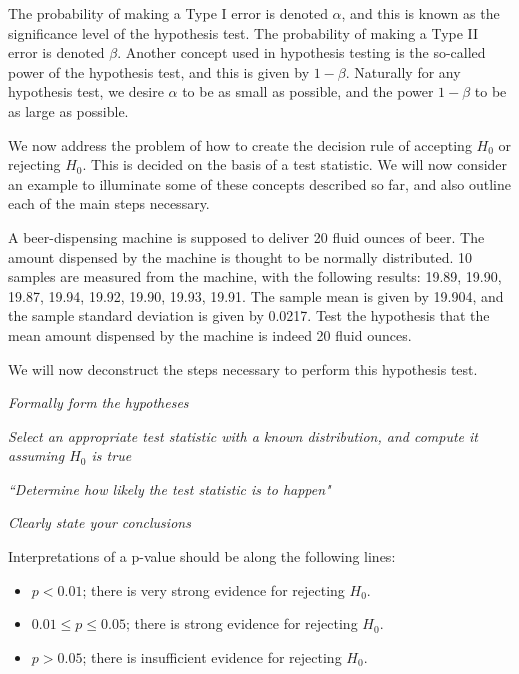 \documentclass[12pt]{article}
\newenvironment{example}[1][Example:]{\begin{trivlist}
\item[\hskip \labelsep {\bfseries #1}]}{\end{trivlist}}
\begin{document}
The probability of making a Type I error is denoted $\alpha$, and this is known as the significance level of the hypothesis test. The probability of making a Type II error is denoted $\beta$. Another concept used in hypothesis testing is the so-called power of the hypothesis test, and this is given by $1-\beta$. Naturally for any hypothesis test, we desire $\alpha$ to be as small as possible, and the power $1-\beta$ to be as large as possible.

We now address the problem of how to create the decision rule of accepting $H_0$ or rejecting $H_0$. This is decided on the basis of a test statistic. We will now consider an example to illuminate some of these concepts described so far, and also outline each of the main steps necessary.

\begin{example}
A beer-dispensing machine is supposed to deliver 20 fluid ounces of beer. The amount dispensed by the machine is thought to be normally distributed. 10 samples are measured from the machine, with the following results: 19.89, 19.90, 19.87, 19.94, 19.92, 19.90, 19.93, 19.91. The sample mean is given by 19.904, and the sample standard deviation is given by 0.0217. Test the hypothesis that the mean amount dispensed by the machine is indeed 20 fluid ounces.
\end{example}

We will now deconstruct the steps necessary to perform this hypothesis test.

\begin{mdframed}
\it{Formally form the hypotheses}
\textcolor[rgb]{1.00,1.00,1.00}{\lipsum[1]}
\end{mdframed}

\begin{mdframed}
\it{Select an appropriate test statistic with a known distribution, and compute it assuming $H_0$ is true}
\textcolor[rgb]{1.00,1.00,1.00}{\lipsum[1]}
\end{mdframed}

\begin{mdframed}
\it{``Determine how likely the test statistic is to happen"}
\textcolor[rgb]{1.00,1.00,1.00}{\lipsum[1-6]}
\end{mdframed}

\begin{mdframed}
\it{Clearly state your conclusions}
\textcolor[rgb]{1.00,1.00,1.00}{\lipsum[1]}
\end{mdframed}

Interpretations of a
p-value should be along the following
lines:
\begin{itemize}
\item $p < 0.01$; there is very strong evidence
for rejecting $H_{0}$.
\item $0.01 \leq p \leq 0.05$; there is strong evidence
for rejecting $H_0$.
\item $p > 0.05$; there is insufficient evidence
for rejecting $H_0$.
\end{itemize}
\end{document}
